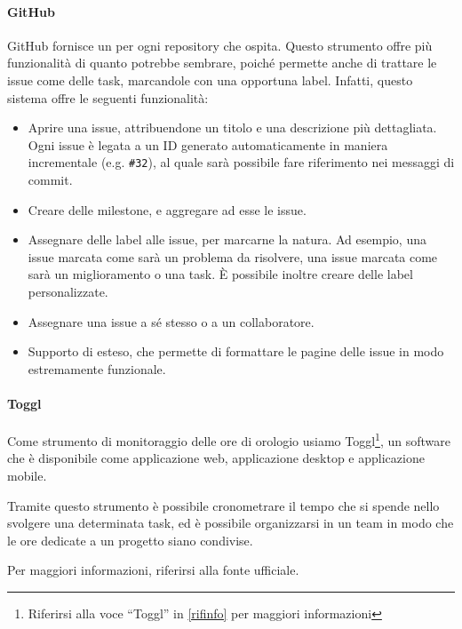     		\paragraph{GitHub}\label{GitHub}
			GitHub fornisce un  per ogni repository che ospita. Questo strumento offre più funzionalità di quanto potrebbe sembrare,
			poich\'e permette anche di trattare le issue come delle task, marcandole con una opportuna label. Infatti, questo sistema offre le seguenti funzionalità:
			\begin{itemize}
				\item Aprire una issue, attribuendone un titolo e una descrizione più dettagliata. Ogni issue è legata a un ID generato automaticamente in maniera
					incrementale (e.g. \texttt{\#32}), al quale sarà possibile fare riferimento nei messaggi di commit.
				\item Creare delle milestone, e aggregare ad esse le issue.
				\item Assegnare delle label alle issue, per marcarne la natura. Ad esempio, una issue marcata come  sarà un problema da risolvere, una
					issue marcata come  sarà un miglioramento o una task. È possibile inoltre creare delle label personalizzate.
				\item Assegnare una issue a s\'e stesso o a un collaboratore.
				\item Supporto di  esteso, che permette di
				formattare le pagine delle issue in modo estremamente funzionale.
			\end{itemize}


			\paragraph{Toggl}\label{toggl}
			Come strumento di monitoraggio delle ore di orologio usiamo Toggl\footnote{Riferirsi alla voce ``Toggl'' in \ref{rifinfo} per maggiori informazioni},
			un software che è disponibile come applicazione web, applicazione
			desktop e applicazione mobile.\par
			Tramite questo strumento è possibile cronometrare il tempo che si spende nello svolgere una determinata task, ed è possibile organizzarsi in un team
			in modo che le ore dedicate a un progetto siano condivise.\par
			Per maggiori informazioni, riferirsi alla fonte ufficiale.



